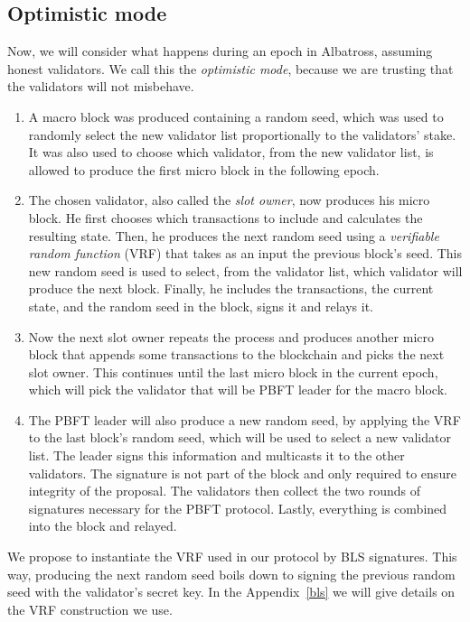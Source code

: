 \documentclass[conference]{IEEEtran}
\begin{document}
\subsection{Optimistic mode}

Now, we will consider what happens during an epoch in Albatross, assuming honest validators. We call this the \textit{optimistic mode}, because we are trusting that the validators will not misbehave.

\begin{enumerate}
	\item A macro block was produced containing a random seed, which was used to randomly select the new validator list proportionally to the validators' stake. It was also used to choose which validator, from the new validator list, is allowed to produce the first micro block in the following epoch.
	\item The chosen validator, also called the \textit{slot owner}, now produces his micro block. He first chooses which transactions to include and calculates the resulting state. Then, he produces the next random seed using a \textit{verifiable random function} (VRF) that takes as an input the previous block's seed. This new random seed is used to select, from the validator list, which validator will produce the next block. Finally, he includes the transactions, the current state, and the random seed in the block, signs it and relays it.
	\item Now the next slot owner repeats the process and produces another micro block that appends some transactions to the blockchain and picks the next slot owner. This continues until the last micro block in the current epoch, which will pick the validator that will be PBFT leader for the macro block.
	\item The PBFT leader will also produce a new random seed, by applying the VRF to the last block's random seed, which will be used to select a new validator list. The leader signs this information and multicasts it to the other validators. The signature is not part of the block and only required to ensure integrity of the proposal. The validators then collect the two rounds of signatures necessary for the PBFT protocol. Lastly, everything is combined into the block and relayed.
\end{enumerate}

We propose to instantiate the VRF used in our protocol by BLS signatures. This way, producing the next random seed boils down to signing the previous random seed with the validator's secret key.
In the Appendix~\ref{bls} we will give details on the VRF construction we use.
\end{document}
